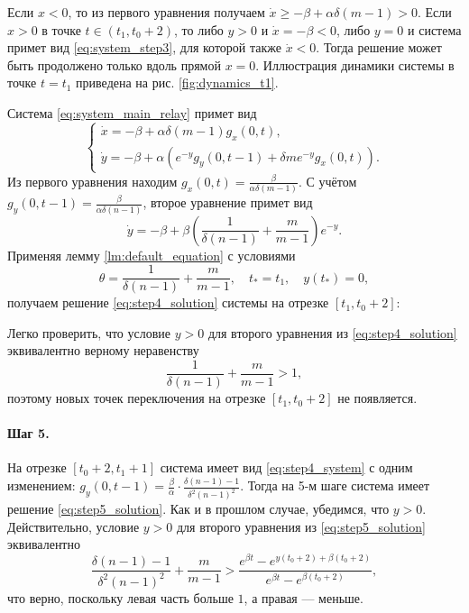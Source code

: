 Если $x < 0$, то из первого уравнения получаем $\dot{x} \geqslant -\beta + \alpha \delta (m - 1) > 0$. Если $x > 0$ в точке $t \in (t_1, t_0 + 2)$, то либо $y > 0$ и $\dot{x} = -\beta < 0$, либо $y = 0$ и система примет вид \eqref{eq:system_step3}, для которой также $\dot{x} < 0$. Тогда решение может быть продолжено только вдоль прямой $x = 0$. Иллюстрация динамики системы в точке $t=t_1$ приведена на рис. \ref{fig:dynamics_t1}.

Система \eqref{eq:system_main_relay} примет вид
%
\begin{equation}
	\label{eq:step4_system}
	\begin{cases}
		\dot{x} = -\beta + \alpha \delta (m - 1) g_x(0, t),\\
		\dot{y} = -\beta + \alpha \left(e^{-y} g_y(0, t - 1) + \delta m e^{-y} g_x(0, t)\right).
	\end{cases}
\end{equation}
%
Из первого уравнения находим $g_x(0, t) = \frac{\beta}{\alpha \delta (m - 1)}$. С учётом $g_y(0, t - 1) = \frac{\beta}{\alpha \delta (n - 1)}$, второе уравнение примет вид
\[
\dot{y} = -\beta + \beta \left(\dfrac{1}{\delta(n - 1)} + \dfrac{m}{m - 1} \right) e^{-y}.
\]
%
Применяя лемму \ref{lm:default_equation} с условиями
\[
\theta = \dfrac{1}{\delta(n - 1)} + \dfrac{m}{m - 1}, \quad t_* = t_1, \quad y(t_*) = 0,
\]
получаем решение \eqref{eq:step4_solution} системы на отрезке $[t_1, t_0 + 2]$:

Легко проверить, что условие $y > 0$ для второго уравнения из \eqref{eq:step4_solution} эквивалентно верному неравенству
\[
\dfrac{1}{\delta(n - 1)} + \dfrac{m}{m - 1} > 1,
\]
поэтому новых точек переключения на отрезке $[t_1, t_0 + 2]$ не появляется.

\paragraph{Шаг 5.} На отрезке $[t_0 + 2, t_1 + 1]$ система имеет вид \eqref{eq:step4_system} с одним изменением: $g_y(0, t - 1) = \frac{\beta}{\alpha} \cdot \frac{\delta(n - 1) - 1}{\delta^2 (n - 1)^2}$.
%
Тогда на 5-м шаге система имеет решение \eqref{eq:step5_solution}.
%
Как и в прошлом случае, убедимся, что $y > 0$. Действительно, условие $y > 0$ для второго уравнения из \eqref{eq:step5_solution} эквивалентно
\[
\frac{\delta(n - 1) - 1}{\delta^2 (n - 1)^2} + \dfrac{m}{m - 1} > \dfrac{e^{\beta t} - e^{y(t_0 + 2) + \beta (t_0 + 2)}}{e^{\beta t} - e^{\beta (t_0 + 2)}},
\]
что верно, поскольку левая часть больше $1$, а правая --- меньше.


